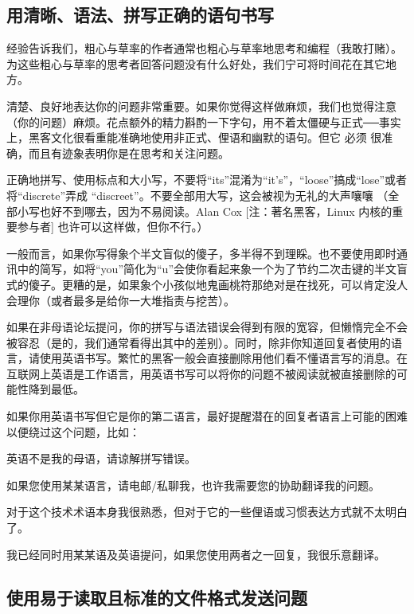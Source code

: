 \subsection{用清晰、语法、拼写正确的语句书写}

经验告诉我们，粗心与草率的作者通常也粗心与草率地思考和编程（我敢打赌）。为这些粗心与草率的思考者回答问题没有什么好处，我们宁可将时间花在其它地方。

清楚、良好地表达你的问题非常重要。如果你觉得这样做麻烦，我们也觉得注意（你的问题）麻烦。花点额外的精力斟酌一下字句，用不着太僵硬与正式──事实上，黑客文化很看重能准确地使用非正式、俚语和幽默的语句。但它 必须 很准确，而且有迹象表明你是在思考和关注问题。

正确地拼写、使用标点和大小写，不要将“its”混淆为“it's”，“loose”搞成“lose”或者将“discrete”弄成 “discreet”。不要全部用大写，这会被视为无礼的大声嚷嚷 （全部小写也好不到哪去，因为不易阅读。Alan Cox [注：著名黑客，Linux 内核的重要参与者] 也许可以这样做，但你不行。）

一般而言，如果你写得象个半文盲似的傻子，多半得不到理睬。也不要使用即时通讯中的简写，如将“you”简化为“u”会使你看起来象一个为了节约二次击键的半文盲式的傻子。更糟的是，如果象个小孩似地鬼画桃符那绝对是在找死，可以肯定没人会理你（或者最多是给你一大堆指责与挖苦）。

如果在非母语论坛提问，你的拼写与语法错误会得到有限的宽容，但懒惰完全不会被容忍（是的，我们通常看得出其中的差别）。同时，除非你知道回复者使用的语言，请使用英语书写。繁忙的黑客一般会直接删除用他们看不懂语言写的消息。在互联网上英语是工作语言，用英语书写可以将你的问题不被阅读就被直接删除的可能性降到最低。

如果你用英语书写但它是你的第二语言，最好提醒潜在的回复者语言上可能的困难以便绕过这个问题，比如：

\begin{compactitem}
\item 英语不是我的母语，请谅解拼写错误。
\item 如果您使用某某语言，请电邮/私聊我，也许我需要您的协助翻译我的问题。
\item 对于这个技术术语本身我很熟悉，但对于它的一些俚语或习惯表达方式就不太明白了。
\item 我已经同时用某某语及英语提问，如果您使用两者之一回复，我很乐意翻译。
\end{compactitem}







\subsection{使用易于读取且标准的文件格式发送问题}

